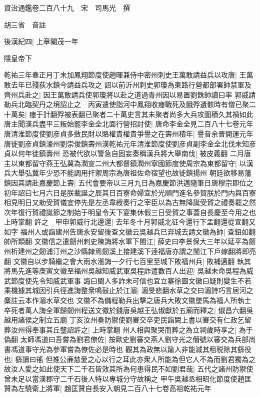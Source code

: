 資治通鑑卷二百八十九　宋　司馬光　撰

胡三省　音註

後漢紀四|{
	上章閹茂一年}


隱皇帝下

乾祐三年春正月丁未加鳳翔節度使趙暉兼侍中密州刺史王萬敢請益兵以攻唐|{
	王萬敢去年已殘荻水鎮今請益兵攻之}
詔以前沂州刺史郭瓊為東路行營都部署帥禁軍及齊州兵赴之|{
	因王萬敢請兵使郭瓊將以赴之道過青州因以易置劉銖帥讀曰率}
郭威請勒兵北臨契丹之境詔止之　丙寅遣使詣河中鳳翔收瘞戰死及餓殍遺骸時有僧已聚二十萬矣|{
	瘞于計翻殍被表翻已聚者二十萬史言其未聚者尚多大兵攻圍積久其禍如此}
唐主聞漢兵盡平三叛始罷李金全北面行營招討使|{
	唐命李金全見二百八十七卷元年}
唐清淮節度使劉彦貞多斂民財以賂權貴權貴爭譽之在壽州積年|{
	譽音余晉開運元年唐徙劉彦貞鎮濠州劉崇俊鎮壽州漢乾祐元年清淮節度使劉彦貞副李金全北伐未知彦貞以何年徙鎮壽州}
恐被代欲以警急自固妄奏稱漢兵將大舉南伐|{
	被皮義翻}
二月唐主以東都留守燕王弘冀為潤宣二州大都督鎮潤州寧國節度使周宗為東都留守|{
	以漢兵大舉弘冀年少恐不能調用扞禦周宗為唐祖佐命宿望也故徙鎮揚州}
朝廷欲移易藩鎮因其請赴嘉慶節上壽|{
	五代會要帝以三月九日為嘉慶節洪邁隨筆日唐穆宗即位之初年詔曰七月六日是朕載誕之辰其日百寮命婦宜於光順門進名參賀朕於門内與百寮相見明日又勑受賀儀宜停先是左丞韋綬奏行之宰臣以為古無降誕受賀之禮奏罷之然次年復行賀禮誕節之制始于明皇令天下宴集休假三日受賀之事蓋自長慶至今用之也上時掌翻}
許之　甲申郭威行北邊還|{
	去年冬十月郭威北征今還行下孟翻還從宣翻又如字}
福州人或詣建州告唐永安留後查文徽云吳越兵已弃城去請文徽為帥|{
	查鈕如翻帥所類翻}
文徽信之遣劒州刺史陳誨將水軍下閩江|{
	薛史曰李景保大三年以延平為劒州析建州之劒浦汀州之沙縣隸焉劒溪上接建溪下逹福唐亦謂之閩江下戶嫁翻將即亮翻}
文徽自以步騎繼之會大雨水漲誨一夕行七百里至城下敗福州兵|{
	敗補邁翻}
執其將馬先進等庚寅文徽至福州吳越知威武軍吳程詐遣數百人出迎|{
	吳越未命吳程為威武節度使先令知威武軍事}
誨曰閩人多詐未可信也宜立寨徐圖文徽曰疑則變生不若乘機據其城因引兵徑進誨整衆鳴鼔止於江湄|{
	湄旻悲翻水草之交曰湄詩巧言居河之麋註云本作湄水草交也}
文徽不為備程勒兵出擊之唐兵大敗文徽墜馬為福人所執士卒死者萬人誨全軍歸劒州程送文徽於錢唐吳越王弘俶獻於五廟而釋之|{
	俶昌六翻吳越用諸侯之制立五廟}
丁亥汝州奏防禦使劉審交卒吏民詣闕上書以審交有仁政乞留葬汝州得奉事其丘壟詔許之|{
	上時掌翻}
州人相與聚哭而葬之為立祠歲時享之|{
	為于偽翻}
太師馮道曰吾嘗為劉君僚佐|{
	按歐史劉審交燕人劉守光之僭號以審交為兵部尚書馮道事守光為參軍嘗為僚佐必是時也}
觀其為政無以踰人非能減其租税除其繇役也|{
	繇讀曰徭}
但推公亷慈愛之心以行之耳此亦衆人所能為但它人不為而劉君獨為之故汝人愛之如此使天下二千石皆效其所為何患得民不如劉君哉|{
	五代之諸州防禦使曾未足以當漢郡守二千石後人特以專城分守故稱之}
甲午吳越丞相昭化節度使趙匡贊為左驍衛上將軍|{
	趙匡贊自長安入朝見二百八十七卷高祖乾祐元年}
